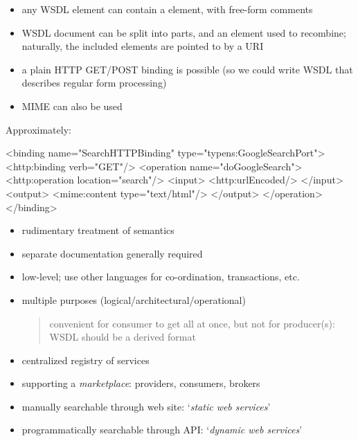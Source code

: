 \documentclass{sepslide-soa-faked} %
\begin{document}
\begin{slide}
	
	\begin{itemize}
	\item any WSDL element can contain a 
	element, with free-form comments

	\item WSDL document can be split into parts, and an 
	element used to recombine;  naturally, the included elements
	are pointed to by a URI

	\item a plain HTTP GET/POST binding is possible
	(so we could write WSDL that describes regular form processing)

	\item MIME can also be used
	\end{itemize}

\end{slide}

\begin{slide}
Approximately:

\begin{xml}
<binding name="SearchHTTPBinding" type="typens:GoogleSearchPort">
  <http:binding verb="GET"/>
  <operation name="doGoogleSearch">
    <http:operation location="search"/>
    <input>
      <http:urlEncoded/>
    </input>
    <output>
      <mime:content type="text/html"/>
    </output>
  </operation>
</binding>
\end{xml}
\end{slide}	

\begin{slide}
	\begin{itemize}
	\item rudimentary treatment of semantics
	\item separate documentation generally required
	\item low-level; use other languages for co-ordination, transactions, etc.
        \item multiple purposes (logical/architectural/operational)
\begin{quote}
convenient for consumer to get all at once, but not for producer(s):
WSDL should be a derived format
\end{quote}
	\end{itemize}
\end{slide}

\begin{slide}
\begin{itemize}
	\item centralized registry of services
        \item supporting a \emph{marketplace}: providers, consumers, brokers
	\item manually searchable through web site:
		`\emph{static web services}'
	\item programmatically searchable through API:
		`\emph{dynamic web services}'
\end{itemize}
\end{slide}
\end{document}
